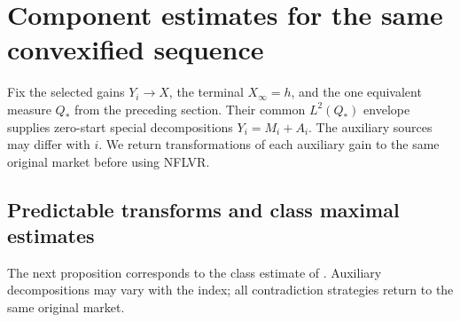 \section{Component estimates for the same convexified sequence}\label{sec:components}
Fix the selected gains $Y_i\to X$, the terminal $X_\infty=h$, and the one
equivalent measure $Q_*$ from the preceding section. Their common $L^2(Q_*)$
envelope supplies zero-start special decompositions $Y_i=M_i+A_i$.
The auxiliary sources may differ with $i$. We return transformations of each
auxiliary gain to the same original market before using NFLVR.

\subsection{Predictable transforms and class maximal estimates}
The next proposition corresponds to the class estimate of \cite[Lemma 4.7]{DS}. Auxiliary decompositions may vary with the index; all contradiction strategies return to the same original market.

